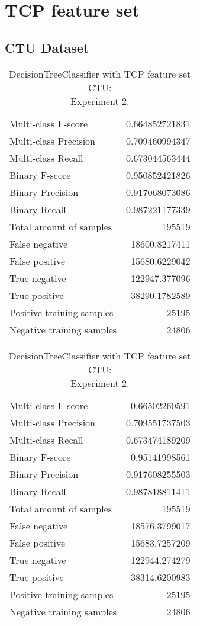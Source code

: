 \newpage
\section{TCP feature set}
\subsection{CTU Dataset}

\begin{table}[H]
\begin{minipage}{0.5\textwidth}
\caption{DecisionTreeClassifier with TCP feature set CTU: \\Experiment 1.}
\centering
\begin{tabular}{l r}
\toprule
Multi-class F-score & 0.664852721831 \\
Multi-class Precision & 0.709460994347 \\
Multi-class Recall & 0.673044563444 \\
\midrule
Binary F-score & 0.950852421826 \\
Binary Precision & 0.917068073086 \\
Binary Recall & 0.987221177339 \\
\midrule
Total amount of samples & 195519 \\
False negative & 18600.8217411 \\
False positive & 15680.6229042 \\
True negative & 122947.377096 \\
True positive & 38290.1782589 \\
\midrule
Positive training samples & 25195 \\
Negative training samples & 24806 \\
\bottomrule
\end{tabular}
\end{minipage}
\hfillx
\begin{minipage}{0.5\textwidth}
\caption{DecisionTreeClassifier with TCP feature set CTU: \\Experiment 2.}
\centering
\begin{tabular}{l r}
\toprule
Multi-class F-score & 0.66502260591 \\
Multi-class Precision & 0.709551737503 \\
Multi-class Recall & 0.673474189209 \\
\midrule
Binary F-score & 0.95141998561 \\
Binary Precision & 0.917608255503 \\
Binary Recall & 0.987818811411 \\
\midrule
Total amount of samples & 195519 \\
False negative & 18576.3799017 \\
False positive & 15683.7257209 \\
True negative & 122944.274279 \\
True positive & 38314.6200983 \\
\midrule
Positive training samples & 25195 \\
Negative training samples & 24806 \\
\bottomrule
\end{tabular}
\end{minipage}
\end{table}
